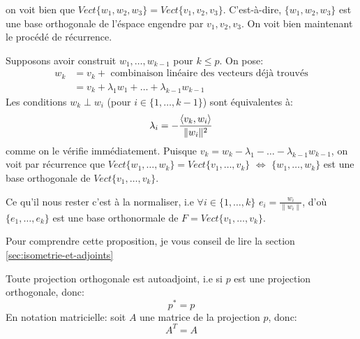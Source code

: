 \begin{preuve}
\[    \] 
    on voit bien que $Vect\{w_1, w_2, w_3\} = Vect\{v_1, v_2, v_3\}$. C'est-à-dire, $\{w_1, w_2, w_3\}$ est une base orthogonale de l'éspace engendre par $v_1, v_2, v_3$. On voit bien maintenant le procédé de récurrence.
    \par
    Supposons avoir construit $w_1, \ldots, w_{k-1}$ pour $k \le p$. On pose:
    \begin{align*}
        w_k &= v_k + \text{ combinaison linéaire des vecteurs déjà trouvés}\\
            &= v_k + \lambda_1w_1 + \ldots + \lambda_{k-1}w_{k-1}
    \end{align*}
    Les conditions $w_k \perp w_i$ (pour $i \in \{1, \ldots, k-1\}$) sont équivalentes à:
    \[
        \lambda_i = - \frac{\left\langle v_k, w_i \right\rangle}{\|w_i\|^2}
    \] 
    comme on le vérifie immédiatement. Puisque $v_k = w_k - \lambda_1 - \ldots - \lambda_{k-1}w_{k-1}$, on voit par récurrence que $Vect\{w_1, \ldots, w_k\} = Vect\{v_1, \ldots, v_k\}$ $\iff$ $\{w_1, \ldots, w_k\}$ est une base orthogonale de $Vect\{v_1, \ldots, v_k\}$.
    \par
    Ce qu'il nous rester c'est à la normaliser, i.e  $\forall i \in \{1, \ldots, k\}$ $e_i = \frac{w_i}{\|w_i\|}$, d'où $\{e_1, \ldots, e_k\}$ est une base orthonormale de $F = Vect\{v_1, \ldots, v_k\}$.
\end{preuve}
\begin{prop} Pour comprendre cette proposition, je vous conseil de lire la section \ref{sec:isometrie-et-adjoints}
    \par
   Toute projection orthogonale est autoadjoint, i.e si $p$ est une projection orthogonale, donc:
   \[
   p^* = p
   \] 
   En notation matricielle: soit $A$ une matrice de la projection  $p$, donc:
    \[
   A^T = A
   \] 
\end{prop}
